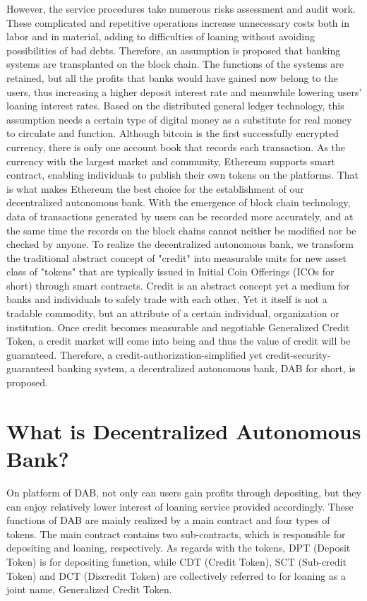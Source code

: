 \documentclass[a4paper, 10pt, conference]{ieeeconf} %
\begin{document}
However, the service procedures take numerous risks assessment and audit work. These complicated and repetitive operations increase unnecessary costs both in labor and in material, adding to difficulties of loaning without avoiding possibilities of bad debts. Therefore, an assumption is proposed that banking systems are transplanted on the block chain. The functions of the systems are retained, but all the profits that banks would have gained now belong to the users, thus increasing a higher deposit interest rate and meanwhile lowering users' loaning interest rates.
Based on the distributed general ledger technology, this assumption needs a certain type of digital money as a substitute for real money to circulate and function. Although bitcoin is the first successfully encrypted currency, there is only one account book that records each transaction. As the currency with the largest market and community, Ethereum supports smart contract, enabling individuals to publish their own tokens on the platforms. That is what makes Ethereum the best choice for the establishment of our decentralized autonomous bank. With the emergence of block chain technology, data of transactions generated by users can be recorded more accurately, and at the same time the records on the block chains cannot neither be modified nor be checked by anyone. 
To realize the decentralized autonomous bank, we transform the traditional abstract concept of "credit" into measurable units for new asset class of "tokens" that are typically issued in Initial Coin Offerings (ICOs for short) through smart contracts. Credit is an abstract concept yet a medium for banks and individuals to safely trade with each other. Yet it itself is not a tradable commodity, but an attribute of a certain individual, organization or institution. Once credit becomes measurable and negotiable Generalized Credit Token, a credit market will come into being and thus the value of credit will be guaranteed.
Therefore, a credit-authorization-simplified yet credit-security-guaranteed banking system, a decentralized autonomous bank, DAB for short, is proposed.

\section{What is Decentralized Autonomous Bank?}
On platform of DAB, not only can users gain profits through depositing, but they can enjoy relatively lower interest of loaning service provided accordingly.
These functions of DAB are mainly realized by a main contract and four types of tokens. The main contract contains two sub-contracts, which is responsible for depositing and loaning, respectively. As regards with the tokens, DPT (Deposit Token) is for depositing function, while CDT (Credit Token), SCT (Sub-credit Token) and DCT (Discredit Token) are collectively referred to for loaning as a joint name, Generalized Credit Token.
\end{document}
